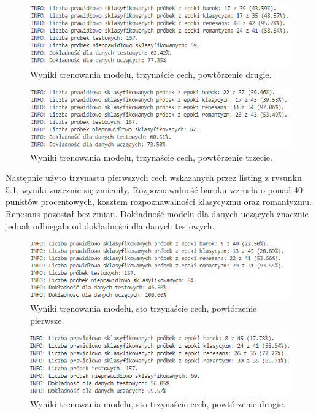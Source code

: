 \documentclass[printmode, eng]{mgr}
\newcommand\tab[1][1cm]{\hspace*{#1}}
\begin{document}
\begin{figure}[H]
\centering
\includegraphics[scale=0.9]{wyniki_small_1.png}
\caption{Wyniki trenowania modelu, trzynaście cech, powtórzenie drugie.}
\end{figure}
\begin{figure}[H]
\centering
\includegraphics[scale=0.9]{wyniki_small_2.png}
\caption{Wyniki trenowania modelu, trzynaście cech, powtórzenie trzecie.}
\end{figure}
\tab Następnie użyto trzynastu pierwszych cech wskazanych przez listing z rysunku 5.1, wyniki znacznie się zmieniły. Rozpoznawalność baroku wzrosła o ponad 40 punktów procentowych, kosztem rozpoznawalności klasycyzmu oraz romantyzmu. Renesans pozostał bez zmian. Dokładność modelu dla danych uczących znacznie jednak odbiegała od dokładności dla danych testowych. 
\begin{figure}[H]
\centering
\includegraphics[scale=0.9]{wyniki_all_0.png}
\caption{Wyniki trenowania modelu, sto trzynaście cech, powtórzenie pierwsze.}
\end{figure}
\begin{figure}[H]
\centering
\includegraphics[scale=0.9]{wyniki_all_1.png}
\caption{Wyniki trenowania modelu, sto trzynaście cech, powtórzenie drugie.}
\end{figure}
\end{document}
